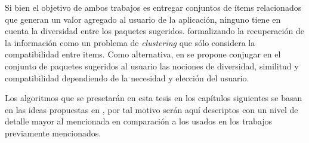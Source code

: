 Si bien el objetivo de ambos trabajos es entregar conjuntos de ítems relacionados que generan un valor agregado al usuario de la aplicación, ninguno tiene en cuenta la diversidad entre los paquetes sugeridos. formalizando la recuperación de la información como un problema de {\em clustering} que sólo considera la compatibilidad entre items. Como alternativa, en \cite{journals/tkde/Amer-YahiaBCFMZ14} se propone conjugar en el conjunto de paquetes sugeridos al usuario las nociones de diversidad, similitud y compatibilidad dependiendo de la necesidad y elección del usuario.

Los algoritmos que se presetarán en esta tesis en los capítulos siguientes se basan en las ideas propuestas en \cite{journals/tkde/Amer-YahiaBCFMZ14}, por tal motivo serán aquí descriptos con un nivel de detalle mayor al mencionada en comparación a los usados en los trabajos previamente mencionados.

